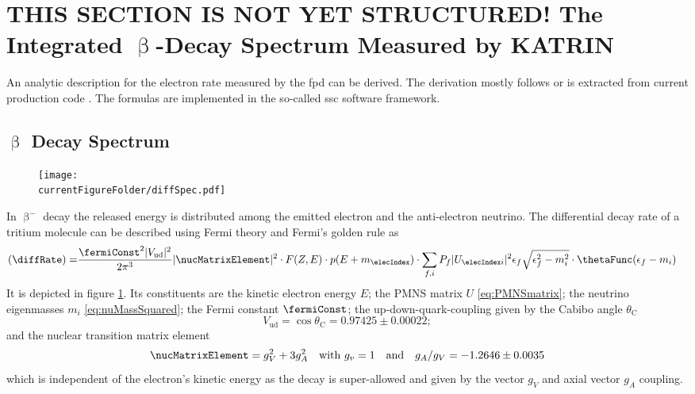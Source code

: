 \def\currentRootFolder{chapter/katrinExperiment/modelOfIntegratedRate}
\def\currentFigureFolder{\currentRootFolder/fig}



\section{THIS SECTION IS NOT YET STRUCTURED! The Integrated \texorpdfstring{$\upbeta$}{Beta}-Decay Spectrum Measured by KATRIN}
\label{sec:katrinExpIntSpecModel}
An analytic description for the electron rate measured by the \gls{fpd} can be derived. The derivation mostly follows \cite{Kleesiek2019, Groh2015, Kleesiek2014} or is extracted from current production code \cite{KATRINCOL2019}. The formulas are implemented in the so-called \gls{ssc} software framework.

\subsection{\texorpdfstring{$\upbeta$}{Beta} Decay Spectrum}
\begin{figure}
    \centering
    \texttt{[image: \\currentFigureFolder/diffSpec.pdf]}
    \label{fig:diffSpec}
\end{figure}
\label{sec:diffSpec}
In $\upbeta^-$ decay the released energy is distributed among the emitted electron and the anti-electron neutrino. The differential decay rate of a tritium molecule can be described using Fermi theory and Fermi's golden rule as
\begin{align}
    \label{eq:diffRate}
    \left(\diffRate\right) = &
    \frac{\fermiConst^2 \abs{V_\mathrm{ud}}^2}{2 \pi^3}
    \abs{\nucMatrixElement}^2 \cdot
    F(Z, E) \cdot 
    p(E+m_\elecIndex) \cdot 
    \sum_{f,i} P_f \abs{U_{\elecIndex i}}^2 \epsilon_f \sqrt{\epsilon_f^2-m_i^2} \cdot \thetaFunc(\epsilon_f-m_i)
\end{align}
It is depicted in figure \ref{fig:diffSpec}. Its constituents are the kinetic electron energy $E$;
the PMNS matrix $U$ \eqref{eq:PMNSmatrix}; the neutrino eigenmasses $m_i$ \eqref{eq:nuMassSquared};
the Fermi constant $\fermiConst$;
the up-down-quark-coupling given by the Cabibo angle $\theta_\mathrm{C}$
\begin{equation}
    V_\mathrm{ud} = \cos \theta_\mathrm{C} = 
    0.97425\pm0.00022;
\end{equation}
and the nuclear transition matrix element
\begin{equation}
    \nucMatrixElement = g_V^2+3g_A^2 \quad
    \text{with } g_v = 1 \quad
    \text{and} \quad g_A/g_V = -1.2646 \pm 0.0035
\end{equation}
which is independent of the electron's kinetic energy as the decay is super-allowed and given by the vector $g_V$ and axial vector $g_A$ coupling.

